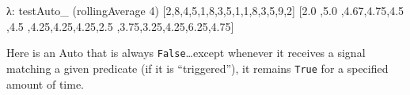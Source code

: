 \documentclass[]{article}
\newenvironment{Shaded}{}{}
\newcommand{\KeywordTok}[1]{\textcolor[rgb]{0.00,0.44,0.13}{\textbf{{#1}}}}
\newcommand{\DataTypeTok}[1]{\textcolor[rgb]{0.56,0.13,0.00}{{#1}}}
\newcommand{\DecValTok}[1]{\textcolor[rgb]{0.25,0.63,0.44}{{#1}}}
\newcommand{\FloatTok}[1]{\textcolor[rgb]{0.25,0.63,0.44}{{#1}}}
\newcommand{\CommentTok}[1]{\textcolor[rgb]{0.38,0.63,0.69}{\textit{{#1}}}}
\newcommand{\OtherTok}[1]{\textcolor[rgb]{0.00,0.44,0.13}{{#1}}}
\newcommand{\FunctionTok}[1]{\textcolor[rgb]{0.02,0.16,0.49}{{#1}}}
\newcommand{\NormalTok}[1]{{#1}}
\begin{document}
\begin{Shaded}
\end{Shaded}

\begin{Shaded}
\begin{Highlighting}[]
\NormalTok{λ}\FunctionTok{:} \NormalTok{testAuto_ (rollingAverage }\DecValTok{4}\NormalTok{) [}\DecValTok{2}\NormalTok{,}\DecValTok{8}\NormalTok{,}\DecValTok{4}\NormalTok{,}\DecValTok{5}\NormalTok{,}\DecValTok{1}\NormalTok{,}\DecValTok{8}\NormalTok{,}\DecValTok{3}\NormalTok{,}\DecValTok{5}\NormalTok{,}\DecValTok{1}\NormalTok{,}\DecValTok{1}\NormalTok{,}\DecValTok{8}\NormalTok{,}\DecValTok{3}\NormalTok{,}\DecValTok{5}\NormalTok{,}\DecValTok{9}\NormalTok{,}\DecValTok{2}\NormalTok{]}
\NormalTok{[}\FloatTok{2.0} \NormalTok{,}\FloatTok{5.0} \NormalTok{,}\FloatTok{4.67}\NormalTok{,}\FloatTok{4.75}\NormalTok{,}\FloatTok{4.5}
\NormalTok{,}\FloatTok{4.5} \NormalTok{,}\FloatTok{4.25}\NormalTok{,}\FloatTok{4.25}\NormalTok{,}\FloatTok{4.25}\NormalTok{,}\FloatTok{2.5}
\NormalTok{,}\FloatTok{3.75}\NormalTok{,}\FloatTok{3.25}\NormalTok{,}\FloatTok{4.25}\NormalTok{,}\FloatTok{6.25}\NormalTok{,}\FloatTok{4.75}\NormalTok{]}
\end{Highlighting}
\end{Shaded}

Here is an Auto that is always \texttt{False}\ldots{}except whenever it receives a signal matching a
given predicate (if it is ``triggered''), it remains \texttt{True} for a specified amount of time.
\end{document}
